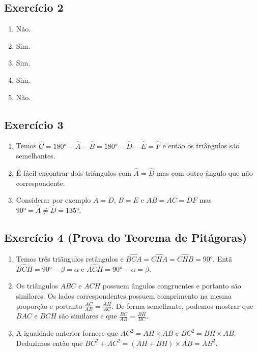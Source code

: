 \subsection{Exercício 2}

\begin{enumerate}
  \item Não.
  \item Sim.
  \item Sim.
  \item Sim.
  \item Não.
\end{enumerate}

\subsection{Exercício 3}

\begin{enumerate}
\item Temos
  $\widehat{C} = {180° - \widehat{A} - \widehat{B}} =
  {180° - \widehat{D} - \widehat{E}} = \widehat{F}$ e então
  os triângulos são semelhantes.
\item É fácil encontrar dois triângulos com $\widehat{A} = \widehat{D}$
  mas com outro ângulo que não correspondente.
\item Considerar por exemplo $A = D$, $B = E$ e $AB = AC = DF$ mas
  $90° = \widehat{A} \neq \widehat{D} = 135°$.
\end{enumerate}

\subsection{Exercício 4 (Prova do Teorema de Pitágoras)}

\begin{enumerate}
\item Temos três triângulos retângulos e
$\widehat{BCA} = \widehat{CHA} = \widehat{CHB} = 90°$. Entã
  $\widehat{BCH} = 90° - \beta = \alpha$ e
  $\widehat{ACH} = 90° - \alpha = \beta$.
\item Os triângulos $ABC$ e $ACH$ possuem ângulos congruentes e portanto são
  similares. Os lados correspondentes possuem comprimento na mesma proporção
  e portanto $\frac{AC}{AB} = \frac{AH}{AC}$.
  De forma semelhante, podemos mostrar que
  $BAC$ e $BCH$ são similares e que $\frac{BC}{AB} = \frac{BH}{BC}$.
\item A igualdade anterior fornece que ${AC}^2 = {AH} \times {AB}$
  e ${BC}^2 = {BH} \times {AB}$. Deduzimos então que
  ${BC}^2 + {AC}^2 = \left({AH} + {BH}\right) \times {AB} = {AB}^2$.
\end{enumerate}

